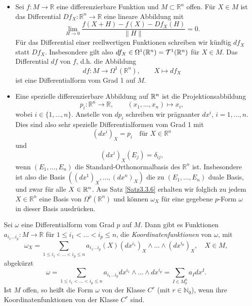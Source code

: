 \documentclass[a4paper,twoside,DIV15,BCOR12mm]{scrbook}
\begin{document}
\bigskip

 \begin{itemize}
\item Sei $f: M \to {\mathbb R}$ eine differenzierbare Funktion 
und $M \subset {\mathbb R}^{n}$ offen. Für $X \in M$ ist das Differential 
$Df_{X}: {\mathbb R}^{n} \to {\mathbb R}$ eine lineare Abbildung mit
\[ \lim_{H \to 0} \frac{f(X + H) - f(X) - Df_{X}(H)}{\|H\|} = 0. \]
Für das Differential einer reellwertigen Funktionen schreiben wir künftig 
$df_{X}$ statt $Df_{X}$. Insbesondere gilt also 
$df_{X} \in\Omega^{1}({\mathbb R}^{n}) = {\cal T}^{1}({\mathbb R}^{n})$ für $X \in M$. 
Das Differential $df$ von $f$, d.h. die Abbildung 
\[ df: M \to \Omega^{1}({\mathbb R}^{n}), \qquad X \mapsto df_{X} \]
ist eine Differentialform vom Grad 1 auf $M$.
\item Eine spezielle differenzierbare Abbildung auf $\mathbb{R}^n$ ist die Projektionsabbildung
\[ p_{i}: {\mathbb R}^{n} \to {\mathbb R}, \qquad (x_{1},\dots,x_{n}) \mapsto x_{i}, \]
wobei $i\in\{1,\ldots,n\}$. 
Anstelle von $dp_{i}$ schreiben wir prägnanter $dx^{i}$, $i = 1,\dots,n$. Dies sind also sehr spezielle Differentialformen vom Grad 1 mit 
\[(dx^{i})_{X} = p_{i}\quad \text{für } X \in {\mathbb R}^{n}\]
und
\[ (dx^{i})_{X}(E_{j}) = \delta_{ij}, \]
wenn $(E_{1},\dots,E_{n})$ die Standard-Orthonormalbasis des ${\mathbb R}^{n}$ ist.
Insbesondere ist also die Basis $((dx^{1})_{X},\dots,(dx^{n})_{X})$ die zu $(E_{1},\dots,E_{n})$ duale Basis,  
und zwar für alle $X\in\mathbb{R}^n$. 
Aus Satz \ref{Satz3.3.6} erhalten wir folglich zu jedem $X \in {\mathbb R}^{n}$ 
eine Basis von $\Omega^{p}({\mathbb R}^{n})$ und können $\omega_{X}$ für 
eine gegebene $p$-Form $\omega$ in dieser Basis ausdrücken.
\end{itemize}

\bigskip

 Sei $\omega$ eine Differentialform vom Grad $p$ auf $M$. 
Dann gibt es Funktionen $a_{i_{1} \dots i_{p}}: M \to {\mathbb R}$ 
für $1 \le i_{1} < \dots < i_{p} \le n$, die {\em Koordinatenfunktionen} von 
$\omega$, mit
\[ \omega_{X} = \sum_{1 \le i_{1} < \dots < i_{p} \le n}
 a_{i_{1}\dots i_{p}}(X)(dx^{i_1})_{X} \wedge \dots \wedge (dx^{i_p})_{X}, \quad X \in M, \]
abgekürzt 
\begin{equation}\label{3.4.1}
\omega = \sum_{1 \le i_{1} < \dots < i_{p} \le n} a_{i_{1} \dots i_{p}} dx^{i_1} 
\wedge \dots \wedge dx^{i_p} = \sum_{I \in M_{p}^{n}} a_{I} dx^{I}.
\end{equation}
Ist $M$ offen, so heißt die Form $\omega$ von der Klasse $C^{r}$ (mit $r \in {\mathbb N}_{0}$), 
wenn ihre Koordinatenfunktionen von der Klasse $C^{r}$ sind.\\ 
\end{document}
